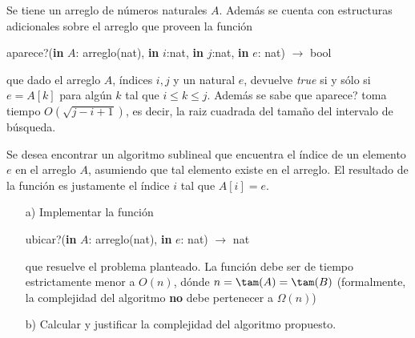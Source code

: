 
Se tiene un arreglo de n\'umeros naturales $A$. Adem\'as se cuenta con
estructuras adicionales sobre el arreglo que proveen la
funci\'on
\begin{center}
aparece?(\textbf{in} $A$: arreglo(nat), \textbf{in} $i$:nat, \textbf{in} $j$:nat, \textbf{in} $e$: nat) $\to$ bool
\end{center}
que dado el arreglo $A$, \'indices $i,j$ y un natural $e$, devuelve \textit{true}
si y s\'olo si $e = A[k]$ para alg\'un $k$ tal que $i \le k \le j$. Adem\'as se
sabe que aparece? toma tiempo $O(\sqrt{j-i+1})$, es decir, la raiz cuadrada del
tama\~no del intervalo de b\'usqueda.

Se desea encontrar un algoritmo sublineal 
que encuentra el \'indice de un elemento $e$ en el arreglo $A$, asumiendo que
tal elemento existe en el arreglo.
El resultado de la funci\'on es justamente el \'indice $i$ tal que $A[i] = e$.

\begin{enumerate}
\item[a)] Implementar la funci\'on
\begin{center}
ubicar?(\textbf{in} $A$: arreglo(nat), \textbf{in} $e$: nat) $\to$ nat
\end{center}
que resuelve el problema planteado. 
La función debe ser de tiempo estrictamente menor a $O(n)$, dónde
$n = \tam(A) = \tam(B)$ (formalmente, la complejidad del algoritmo \textbf{no}
debe pertenecer a $\Omega(n)$)
\item[b)] Calcular y justificar la complejidad del algoritmo propuesto. 
\end{enumerate}

